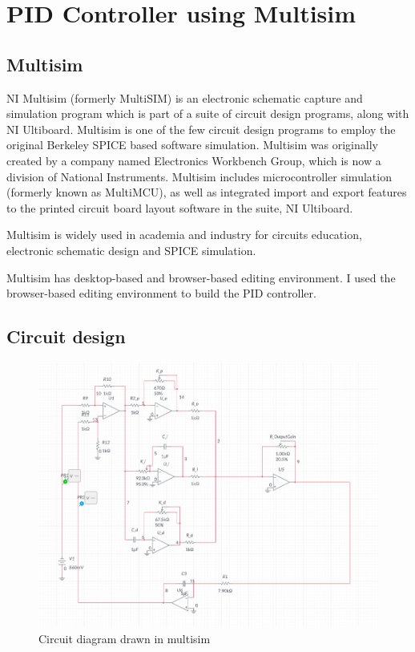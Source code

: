 \chapter{\label{results}PID Controller using Multisim}


\section{Multisim}
NI Multisim (formerly MultiSIM) is an electronic schematic capture and simulation program which is part of a suite of circuit design programs, along with NI Ultiboard. Multisim is one of the few circuit design programs to employ the original Berkeley SPICE based software simulation. Multisim was originally created by a company named Electronics Workbench Group, which is now a division of National Instruments. Multisim includes microcontroller simulation (formerly known as MultiMCU), as well as integrated import and export features to the printed circuit board layout software in the suite, NI Ultiboard.

Multisim is widely used in academia and industry for circuits education, electronic schematic design and SPICE simulation. 

Multisim has desktop-based and browser-based editing environment. I used the browser-based editing environment to build the PID controller. 

\section{Circuit design}
\begin{figure}
	\includegraphics[width = \textwidth]{circuit.png}
	\caption{Circuit diagram drawn in multisim}
\end{figure}

